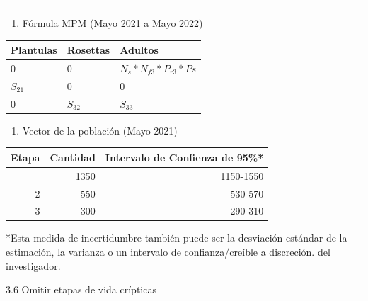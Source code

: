 \documentclass[
]{book}
\providecommand{\tightlist}{%
  \setlength{\itemsep}{0pt}\setlength{\parskip}{0pt}}
\theoremstyle{definition}
\theoremstyle{definition}
\theoremstyle{definition}
\theoremstyle{definition}
\theoremstyle{remark}
\begin{document}
\begin{center}\rule{0.5\linewidth}{0.5pt}\end{center}

\begin{enumerate}
\def\labelenumi{(\Alph{enumi})}
\setcounter{enumi}{6}
\tightlist
\item
  Fórmula MPM (Mayo 2021 a Mayo 2022)
\end{enumerate}

\begin{tabular}{l|l|l}
\hline
Plantulas & Rosettas & Adultos\\
\hline
0 & 0 & $N_{s}*N_{f3}*P_{r3}*P{s}$\\
\hline
$S_{21}$ & 0 & 0\\
\hline
0 & $S_{32}$ & $S_{33}$\\
\hline
\end{tabular}

\begin{enumerate}
\def\labelenumi{(\Alph{enumi})}
\setcounter{enumi}{7}
\tightlist
\item
  Vector de la población (Mayo 2021)
\end{enumerate}

\begin{longtable}{rrr}
\toprule
Etapa & Cantidad & Intervalo de Confienza de 95\%* \\ 
\midrule\addlinespace[2.5pt]
1 & 1350 & 1150-1550 \\ 
2 & 550 & 530-570 \\ 
3 & 300 & 290-310 \\ 
\bottomrule
\end{longtable}

*Esta medida de incertidumbre también puede ser la desviación estándar de la estimación, la varianza o un intervalo de confianza/creíble a discreción.
del investigador.

3.6 \textbar{} Omitir etapas de vida crípticas
\end{document}
